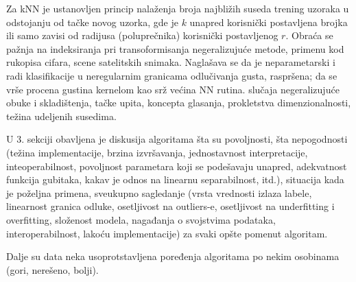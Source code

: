 \documentclass[fontsize=12bp, paper=a4]{scrarticle}
\begin{document}
\vbox{}

Za kNN je ustanovljen princip nalaženja broja najbližih suseda trening uzoraka u odstojanju od tačke novog uzorka, gde je $k$ unapred korisnički postavljena brojka ili samo zavisi od radijusa (poluprečnika) korisnički postavljenog $r$. Obraća se pažnja na indeksiranja pri transoformisanja negeralizujuće metode, primenu kod rukopisa cifara, scene satelitskih snimaka. Naglašava se da je neparametarski i radi klasifikacije u neregularnim granicama odlučivanja gusta, raspršena; da se vrše procena gustina kernelom kao srž većina NN rutina. slučaja negeralizujuće obuke i skladištenja, tačke upita, koncepta glasanja, prokletstva dimenzionalnosti, težina udeljenih susedima. 

\vbox{}

U 3. sekciji obavljena je diskusija algoritama šta su povoljnosti, šta nepogodnosti (težina implementacije, brzina izvršavanja, jednostavnost interpretacije, inteoperabilnost, povoljnost parametara koji se podešavaju unapred, adekvatnost funkcija gubitaka, kakav je odnos na linearnu separabilnost, itd.), situacija kada je poželjna primena, sveukupno sagledanje (vrsta vrednosti izlaza labele, linearnost granica odluke, osetljivost na outliers-e, osetljivost na underfitting i overfitting, složenost modela, nagađanja o svojstvima podataka, interoperabilnost, lakoću implementacije) za svaki opšte pomenut algoritam.

Dalje su data neka usoprotstavljena poređenja algoritama po nekim osobinama (gori, nerešeno, bolji).




\end{document}
